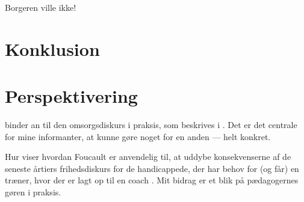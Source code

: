 Borgeren ville ikke!

\section{Konklusion}

\section{Perspektivering}
binder an til den omsorgsdiskurs i praksis, som beskrives i .
Det er det centrale for mine informanter, at kunne gøre noget for en anden — helt konkret.

Hur viser hvordan Foucault er anvendelig til, at uddybe konsekvenserne af de seneste årtiers frihedsdiskurs for de handicappede, der har behov for (og får) en træner, hvor der er lagt op til en coach \autocite{hurFrigorelsensMagt2015}.
Mit bidrag er et blik på pædagogernes gøren i praksis.
